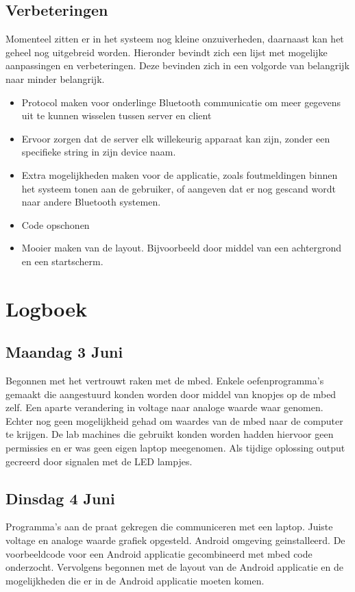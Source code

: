 \documentclass[a4paper]{article}
\begin{document}
		\subsection{Verbeteringen}
			Momenteel zitten er in het systeem nog kleine onzuiverheden, daarnaast kan het geheel nog uitgebreid worden. Hieronder bevindt zich een lijst met mogelijke aanpassingen en verbeteringen. Deze bevinden zich in een volgorde van belangrijk naar minder belangrijk.
			\begin{itemize}
				\item Protocol maken voor onderlinge Bluetooth communicatie om meer gegevens uit te kunnen wisselen tussen server en client
				\item Ervoor zorgen dat de server elk willekeurig apparaat kan zijn, zonder een specifieke string in zijn device naam.
				\item Extra mogelijkheden maken voor de applicatie, zoals foutmeldingen binnen het systeem tonen aan de gebruiker, of aangeven dat er nog gescand wordt naar andere Bluetooth systemen.
				\item Code opschonen
				\item Mooier maken van de layout. Bijvoorbeeld door middel van een achtergrond en een startscherm.
			\end{itemize}
	\section{Logboek}
		\subsection{Maandag 3 Juni}
			Begonnen met het vertrouwt raken met de mbed. Enkele oefenprogramma's gemaakt die aangestuurd konden worden door middel van knopjes op de mbed zelf. Een aparte verandering in voltage naar analoge waarde waar genomen. Echter nog geen mogelijkheid gehad om waardes van de mbed naar de computer te krijgen. De lab machines die gebruikt konden worden hadden hiervoor geen permissies en er was geen eigen laptop meegenomen. Als tijdige oplossing output gecreerd door signalen met de LED lampjes.
		\subsection{Dinsdag 4 Juni}
			Programma's aan de praat gekregen die communiceren met een laptop. Juiste voltage en analoge waarde grafiek opgesteld. Android omgeving geinstalleerd. De voorbeeldcode voor een Android applicatie gecombineerd met mbed code onderzocht. Vervolgens begonnen met de layout van de Android applicatie en de mogelijkheden die er in de Android applicatie moeten komen.
\end{document}
